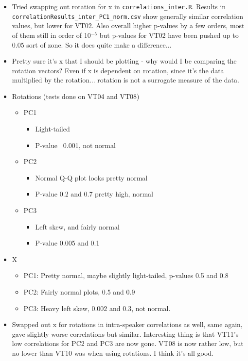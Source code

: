 \documentclass{article}
\begin{document}
\begin{itemize}
\begin{itemize}
        \item Tried swapping out rotation for x in \verb|correlations_inter.R|. Results in \verb|correlationResults_inter_PC1_norm.csv| show generally similar correlation values, but lower for VT02. Also overall higher p-values by a few orders, most of them still in order of 10$^{-5}$ but p-values for VT02 have been pushed up to 0.05 sort of zone. So it does quite make a difference...
        \item Pretty sure it's x that I should be plotting - why would I be comparing the rotation vectors? Even if x is dependent on rotation, since it's the data multiplied by the rotation... rotation is not a surrogate measure of the data.
        \item Rotations (tests done on VT04 and VT08)
        \begin{itemize}
            \item PC1
            \begin{itemize}
                \item Light-tailed
                \item P-value ~0.001, not normal
            \end{itemize} 
            \item PC2
            \begin{itemize}
                \item Normal Q-Q plot looks pretty normal
                \item P-value 0.2 and 0.7 pretty high, normal
            \end{itemize}
            \item PC3
            \begin{itemize}
                \item Left skew, and fairly normal
                \item P-value 0.005 and 0.1
            \end{itemize}
        \end{itemize}
        \item X
        \begin{itemize}
            \item PC1: Pretty normal, maybe slightly light-tailed, p-values 0.5 and 0.8
            \item PC2: Fairly normal plots, 0.5 and 0.9
            \item PC3: Heavy left skew, 0.002 and 0.3, not normal.
        \end{itemize}
        \item Swapped out x for rotations in intra-speaker correlations as well, same again, gave slightly worse correlations but similar. Interesting thing is that VT11's low correlations for PC2 and PC3 are now gone. VT08 is now rather low, but no lower than VT10 was when using rotations. I think it's all good.

\end{itemize}
\end{itemize}
\end{document}

